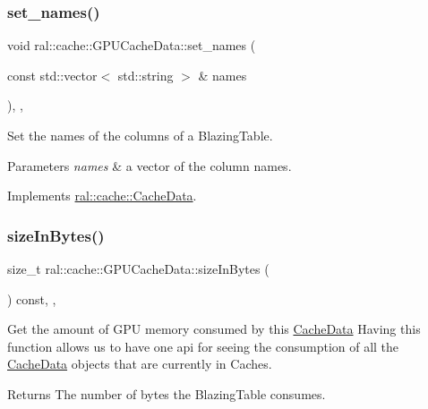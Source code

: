 \subsubsection{\texorpdfstring{set\+\_\+names()}{set\_names()}}
{\footnotesize\ttfamily void ral\+::cache\+::\+G\+P\+U\+Cache\+Data\+::set\+\_\+names (\begin{DoxyParamCaption}\item[{const std\+::vector$<$ std\+::string $>$ \&}]{names }\end{DoxyParamCaption})\hspace{0.3cm}{\ttfamily [inline]}, {\ttfamily [override]}, {\ttfamily [virtual]}}

Set the names of the columns of a Blazing\+Table. 
\begin{DoxyParams}{Parameters}
{\em names} & a vector of the column names. \\
\hline
\end{DoxyParams}


Implements \hyperlink{classral_1_1cache_1_1CacheData_a3bb1623a4266ba7c961d325023ff13c6}{ral\+::cache\+::\+Cache\+Data}.

\mbox{\label{classral_1_1cache_1_1GPUCacheData_a4fc8aecb334114f0ef07ce37be0e8900}} 
\subsubsection{\texorpdfstring{size\+In\+Bytes()}{sizeInBytes()}}
{\footnotesize\ttfamily size\+\_\+t ral\+::cache\+::\+G\+P\+U\+Cache\+Data\+::size\+In\+Bytes (\begin{DoxyParamCaption}{ }\end{DoxyParamCaption}) const\hspace{0.3cm}{\ttfamily [inline]}, {\ttfamily [override]}, {\ttfamily [virtual]}}

Get the amount of G\+PU memory consumed by this \hyperlink{classral_1_1cache_1_1CacheData}{Cache\+Data} Having this function allows us to have one api for seeing the consumption of all the \hyperlink{classral_1_1cache_1_1CacheData}{Cache\+Data} objects that are currently in Caches. \begin{DoxyReturn}{Returns}
The number of bytes the Blazing\+Table consumes. 
\end{DoxyReturn}



